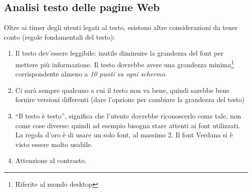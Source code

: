 \subsection{Analisi testo delle pagine Web}

Oltre ai timer degli utenti legati al testo, esistono altre considerazioni da tener conto (regole fondamentali del testo):
\begin{enumerate}

\item Il testo dev'essere leggibile: inutile diminuire la grandezza del font per mettere pi\`u informazione. Il testo dovrebbe avere una grandezza minima\footnote{Riferite al mondo desktop} corrispondente almeno a \textit{10 punti su ogni schermo}.

\item Ci sar\`a sempre qualcuno a cui il testo non va bene, quindi sarebbe bene fornire versioni differenti (dare l'opzione per cambiare la grandezza del testo)

\item ``Il testo \`e testo'', significa che l'utente dovrebbe riconoscerlo come tale, non come cose diverse: quindi ad esempio bisogna stare attenti ai font utilizzati. La regola d'oro \`e di usare un solo font, al massimo 2. Il font Verdana si \`e visto essere molto usabile.

\item Attenzione al contrasto.

\end{enumerate}
